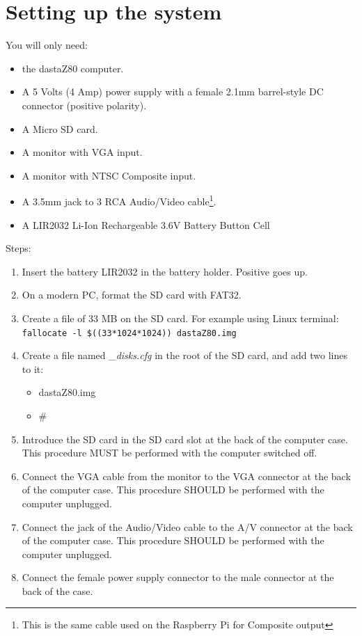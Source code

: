 \documentclass[a4paper,11pt]{article}
\begin{document}
    \pagebreak
    \section{Setting up the system}
    You will only need:

    \begin{itemize}
        \item the dastaZ80 computer.
        \item A 5 Volts (4 Amp) power supply with a female 2.1mm barrel-style DC
        connector (positive polarity).
        \item A Micro SD card.
        \item A monitor with VGA input.
        \item A monitor with NTSC Composite input.
        \item A 3.5mm jack to 3 RCA Audio/Video cable\footnote{This is the same
        cable used on the Raspberry Pi for Composite output}.
        \item A LIR2032 Li-Ion Rechargeable 3.6V Battery Button Cell
    \end{itemize}

    Steps:

    \begin{enumerate}
        \item Insert the battery LIR2032 in the battery holder. Positive goes up.
        \item On a modern PC, format the SD card with FAT32.
        \item Create a file of 33 MB on the SD card. For example using Linux 
        terminal:  \texttt{fallocate -l \$((33*1024*1024)) dastaZ80.img}
        \item Create a file named \textit{\_disks.cfg} in the root of the SD card,
        and add two lines to it:
        \begin{itemize}
            \item dastaZ80.img
            \item \#
        \end{itemize}
        \item Introduce the SD card in the SD card slot at the back of the
        computer case. This procedure MUST be performed with the computer
        switched off.
        \item Connect the VGA cable from the monitor to the VGA connector at the
        back of the computer case. This procedure SHOULD be performed with the
        computer unplugged.
        \item Connect the jack of the Audio/Video cable to the A/V connector at
        the back of the computer case. This procedure SHOULD be performed with
        the computer unplugged.
        \item Connect the female power supply connector to the male connector at
        the back of the case.
    \end{enumerate}
\end{document}
